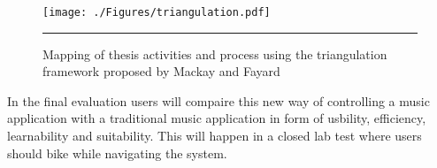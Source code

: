 \begin{figure}[htbp]
	\centering
		\texttt{[image: ./Figures/triangulation.pdf]}
		\rule{35em}{0.5pt}
	\caption[Triangulation]{Mapping of thesis activities and process using the triangulation framework proposed by Mackay and Fayard \cite{mackay_hci_1997}}
	\label{fig:triangulation}
\end{figure}

In the final evaluation users will compaire this new way of controlling a music application with a traditional music application in form of usbility, efficiency, learnability and suitability. This will happen in a closed lab test where users should bike while navigating the system.






